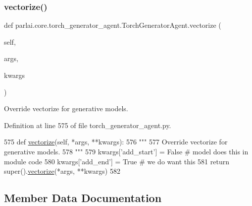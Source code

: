 \subsubsection{\texorpdfstring{vectorize()}{vectorize()}}
{\footnotesize\ttfamily def parlai.\+core.\+torch\+\_\+generator\+\_\+agent.\+Torch\+Generator\+Agent.\+vectorize (\begin{DoxyParamCaption}\item[{}]{self,  }\item[{}]{args,  }\item[{}]{kwargs }\end{DoxyParamCaption})}

\begin{DoxyVerb}Override vectorize for generative models.
\end{DoxyVerb}
 

Definition at line 575 of file torch\+\_\+generator\+\_\+agent.\+py.


\begin{DoxyCode}
575     \textcolor{keyword}{def }\hyperlink{namespaceparlai_1_1agents_1_1drqa_1_1utils_a5c76cc39e3014c7bcf9199d566dbdc0f}{vectorize}(self, *args, **kwargs):
576         \textcolor{stringliteral}{"""}
577 \textcolor{stringliteral}{        Override vectorize for generative models.}
578 \textcolor{stringliteral}{        """}
579         kwargs[\textcolor{stringliteral}{'add\_start'}] = \textcolor{keyword}{False}  \textcolor{comment}{# model does this in module code}
580         kwargs[\textcolor{stringliteral}{'add\_end'}] = \textcolor{keyword}{True}  \textcolor{comment}{# we do want this}
581         \textcolor{keywordflow}{return} super().\hyperlink{namespaceparlai_1_1agents_1_1drqa_1_1utils_a5c76cc39e3014c7bcf9199d566dbdc0f}{vectorize}(*args, **kwargs)
582 
\end{DoxyCode}


\subsection{Member Data Documentation}
\mbox{\label{classparlai_1_1core_1_1torch__generator__agent_1_1TorchGeneratorAgent_a64484ea8971fc2a665e99f99a60f0653}} 
